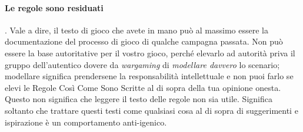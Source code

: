 \paragraph{Le regole sono residuati}\label{notes:cruft}. Vale a dire, il testo di gioco che avete in mano può al massimo essere la documentazione del processo di gioco di qualche campagna passata. Non può essere la base autoritative per il vostro gioco, perché elevarlo ad autorità priva il gruppo dell'autentico dovere da \textit{wargaming} di \textit{modellare davvero} lo scenario; modellare significa prendersene la responsabilità intellettuale e non puoi farlo se elevi le Regole Così Come Sono Scritte al di sopra della tua opinione onesta.\\
Questo non significa che leggere il testo delle regole non sia utile. Significa soltanto che trattare questi testi come qualsiasi cosa al di sopra di suggerimenti e ispirazione è un comportamento anti-igenico.